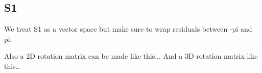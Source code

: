 
\subsection{S1}
We treat S1 as a vector space but make sure to wrap residuals between -pi and
pi. 

Also a 2D rotation matrix can be made like this...
And a 3D rotation matrix like this..
